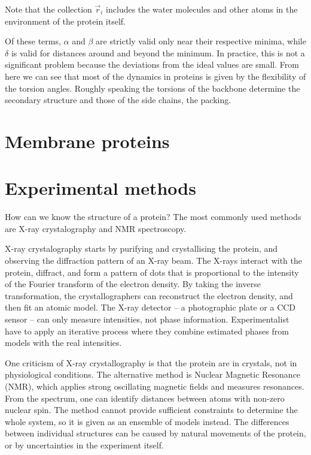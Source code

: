 Note that the collection $\vec r_i$ %
includes the water molecules and other atoms in the environment of the protein itself.

Of these terms, $\alpha$ and $\beta$ are strictly valid only near their respective minima, while $\delta$ is valid for distances around and beyond the minimum.
In practice, this is not a significant problem because the deviations from the ideal values are small. 
From here we can see that most of the dynamics in proteins is given by the flexibility of the torsion angles.
Roughly speaking the torsions of the backbone determine the secondary structure and those of the side chains, the packing.

\section{Membrane proteins}
\section{Experimental methods}
How can we know the structure of a protein?
The most commonly used methods are X-ray crystalography and NMR spectroscopy.

X-ray crystalography starts by
purifying and crystallising the protein, and observing the diffraction pattern of an X-ray beam.
The X-rays interact with the protein, diffract, and form a pattern of dots that is proportional to the intensity of the Fourier transform of the electron density.
By taking the inverse transformation, the crystallographers can reconstruct the electron density, and then fit an atomic model.
The X-ray detector -- a photographic plate or a CCD sensor -- can only measure intensities, not phase information.
Experimentalist have to apply an iterative process where they combine estimated phases from models with the real intensities.

One criticism of X-ray crystallography is that the protein are in crystals, not in physiological conditions.
The alternative method is Nuclear Magnetic Resonance (NMR),  which applies strong oscillating magnetic fields and measures resonances.
From the spectrum, one can identify distances between atoms with non-zero nuclear spin.
The method cannot provide sufficient constraints to determine the whole system, so it is given as an ensemble of models instead.
The differences between individual structures can be caused by natural movements of the protein, or by uncertainties in the experiment itself.

